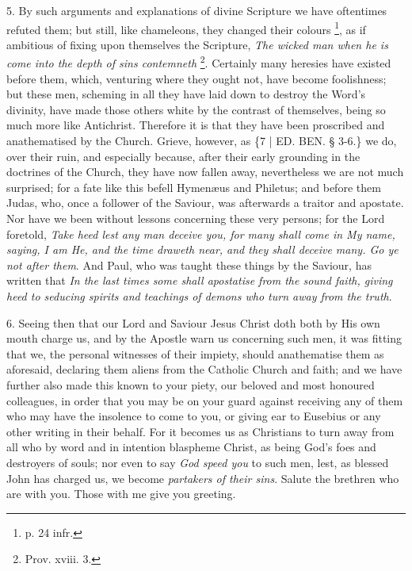 5. By such
arguments and explanations of divine Scripture we have oftentimes
refuted them; but still, like chameleons, they changed their colours \footnote{p. 24 infr.}, as if ambitious of fixing upon themselves the Scripture, \emph{The
wicked man when he is come into the depth of sins contemneth} \footnote{Prov. xviii. 3.}. Certainly many heresies have existed before them, which,
venturing where they ought not, have become foolishness; but these
men, scheming in all they have laid down to destroy the Word's
divinity, have made those others white by the contrast of themselves,
being so much more like Antichrist. Therefore it is that they have
been proscribed and anathematised by the Church. Grieve, however, as
\{7 | ED.
BEN. § 3-6.\} we do, over their ruin, and
especially because, after their early grounding in the doctrines of
the Church, they have now fallen away, nevertheless we are not much
surprised; for a fate like this befell Hymenæus and Philetus; and
before them Judas, who, once a follower of the Saviour, was afterwards
a traitor and apostate. Nor have we been without lessons concerning
these very persons; for the Lord foretold, \emph{Take heed lest any man
deceive you, for many shall come in My name, saying, I am He, and the
time draweth near, and they shall deceive many. Go ye not after them}.
And Paul, who was taught these things by the Saviour, has written that
\emph{In the last times some shall apostatise from the sound faith,
giving heed to seducing spirits and teachings of demons who turn away
from the truth}.

6. Seeing
then that our Lord and Saviour Jesus Christ doth both by His own mouth
charge us, and by the Apostle warn us concerning such men, it was
fitting that we, the personal witnesses of their impiety, should
anathematise them as aforesaid, declaring them aliens from the
Catholic Church and faith; and we have further also made this known to
your piety, our beloved and most honoured colleagues, in order that
you may be on your guard against receiving any of them who may have
the insolence to come to you, or giving ear to Eusebius or any other
writing in their behalf. For it becomes us as Christians to turn away
from all who by word and in intention blaspheme Christ, as being God's
foes and destroyers of souls; nor even to say \emph{God speed you} to
such men, lest, as blessed John has charged us, we become \emph{partakers
of their sins}. Salute the brethren who are with you. Those with me
give you greeting.


